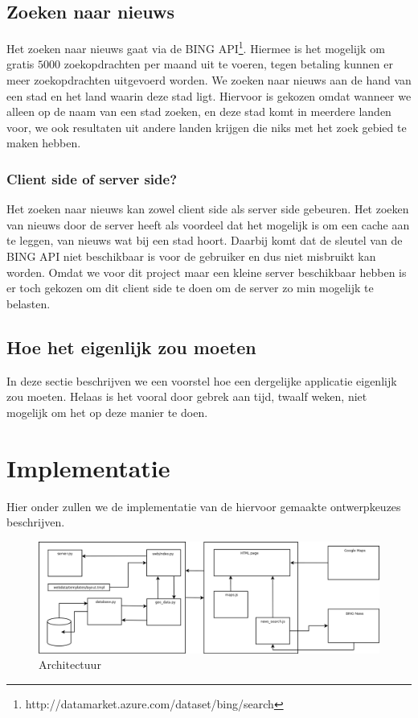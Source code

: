 \documentclass[twoside,openright]{uva-bachelor-thesis}
\begin{document}
	\section{Zoeken naar nieuws}
		Het zoeken naar nieuws gaat via de BING API\footnote{http://datamarket.azure.com/dataset/bing/search}. Hiermee is het mogelijk om gratis $5000$ zoekopdrachten per maand uit te voeren, tegen betaling kunnen er meer zoekopdrachten uitgevoerd worden. We zoeken naar nieuws aan de hand van een stad en het land waarin deze stad ligt. Hiervoor is gekozen omdat wanneer we alleen op de naam van een stad zoeken, en deze stad komt in meerdere landen voor, we ook resultaten uit andere landen krijgen die niks met het zoek gebied te maken hebben. 
		\subsection{Client side of server side?}
			Het zoeken naar nieuws kan zowel client side als server side gebeuren.
			Het zoeken van nieuws door de server heeft als voordeel dat het mogelijk is om een cache aan te leggen, van nieuws wat bij een stad hoort. Daarbij komt dat de sleutel van de BING API niet beschikbaar is voor de gebruiker en dus niet misbruikt kan worden. 
			Omdat we voor dit project maar een kleine server beschikbaar hebben is er toch gekozen om dit client side te doen om de server zo min mogelijk te belasten.
	\section{Hoe het eigenlijk zou moeten}
		In deze sectie beschrijven we een voorstel hoe een dergelijke applicatie eigenlijk zou moeten. Helaas is het vooral door gebrek aan tijd, twaalf weken, niet mogelijk om het op deze manier te doen. 
		\\[0.5cm]
		
\chapter{Implementatie}
	Hier onder zullen we de implementatie van de hiervoor gemaakte ontwerpkeuzes beschrijven.
	\begin{figure}[!htb]
		\label{fig:arch}
		\centering
		\includegraphics[scale=0.3]{./img/architecture.png}
		\caption{Architectuur}
	\end{figure}
\end{document}

